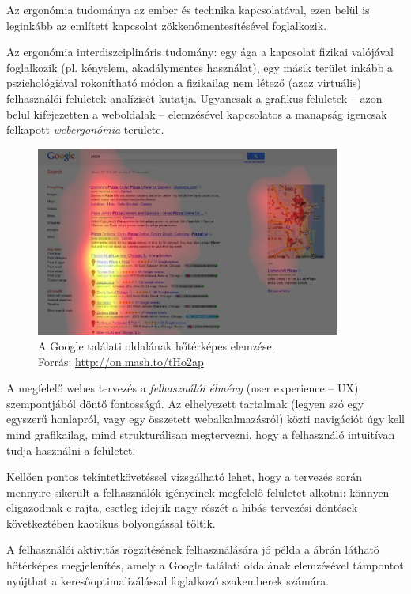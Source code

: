 Az ergonómia tudománya az ember és technika kapcsolatával, ezen belül is leginkább az említett kapcsolat zökkenőmentesítésével foglalkozik. 

Az ergonómia interdiszciplináris tudomány: egy ága a kapcsolat fizikai valójával foglalkozik (pl. kényelem, akadálymentes használat), egy másik terület inkább a pszichológiával rokonítható módon a fizikailag nem létező (azaz virtuális) felhasználói felületek analízisét kutatja. Ugyancsak a grafikus felületek -- azon belül kifejezetten a weboldalak -- elemzésével kapcsolatos a manapság igencsak felkapott \emph{webergonómia} területe.

\begin{figure}[!ht]
\centering
\includegraphics[width=100mm, keepaspectratio]{figures/google_heatmap.png}
\caption{A Google találati oldalának hőtérképes elemzése.\\Forrás: \url{http://on.mash.to/tHo2ap}}
\label{fig:google_heatmap}
\end{figure}

A megfelelő webes tervezés a \emph{felhasználói élmény} (user experience -- UX) szempontjából döntő fontosságú. Az elhelyezett tartalmak (legyen szó egy egyszerű honlapról, vagy egy összetett webalkalmazásról) közti navigációt úgy kell mind grafikailag, mind strukturálisan megtervezni, hogy a felhasználó intuitívan tudja használni a felületet.

Kellően pontos tekintetkövetéssel vizsgálható lehet, hogy a tervezés során mennyire sikerült a felhasználók igényeinek megfelelő felületet alkotni: könnyen eligazodnak-e rajta, esetleg idejük nagy részét a hibás tervezési döntések következtében kaotikus bolyongással töltik.

A felhasználói aktivitás rögzítésének felhasználására jó példa a  ábrán látható hőtérképes megjelenítés, amely a Google találati oldalának elemzésével támpontot nyújthat a keresőoptimalizálással foglalkozó szakemberek számára.

